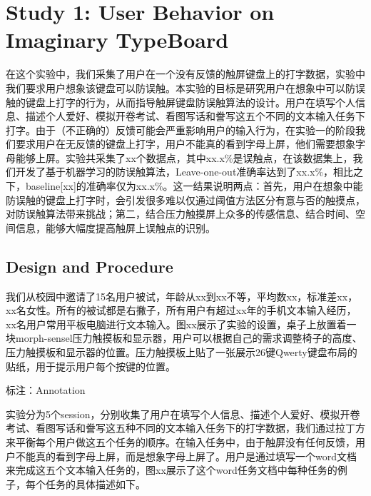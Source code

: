 \section{Study 1: User Behavior on Imaginary TypeBoard}

在这个实验中，我们采集了用户在一个没有反馈的触屏键盘上的打字数据，实验中我们要求用户想象该键盘可以防误触。本实验的目标是研究用户在想象中可以防误触的键盘上打字的行为，从而指导触屏键盘防误触算法的设计。用户在填写个人信息、描述个人爱好、模拟开卷考试、看图写话和誊写这五个不同的文本输入任务下打字。由于（不正确的）反馈可能会严重影响用户的输入行为，在实验一的阶段我们要求用户在无反馈的键盘上打字，用户不能真的看到字母上屏，他们需要想象字母能够上屏。实验共采集了xx个数据点，其中xx.x\%是误触点，在该数据集上，我们开发了基于机器学习的防误触算法，Leave-one-out准确率达到了xx.x\%，相比之下，baseline[xx]的准确率仅为xx.x\%。这一结果说明两点：首先，用户在想象中能防误触的键盘上打字时，会引发很多难以仅通过阈值方法区分有意与否的触摸点，对防误触算法带来挑战；第二，结合压力触摸屏上众多的传感信息、结合时间、空间信息，能够大幅度提高触屏上误触点的识别。

\subsection{Design and Procedure}

我们从校园中邀请了15名用户被试，年龄从xx到xx不等，平均数xx，标准差xx，xx名女性。所有的被试都是右撇子，所有用户有超过xx年的手机文本输入经历，xx名用户常用平板电脑进行文本输入。图xx展示了实验的设置，桌子上放置着一块morph-sensel压力触摸板和显示器，用户可以根据自己的需求调整椅子的高度、压力触摸板和显示器的位置。压力触摸板上贴了一张展示26键Qwerty键盘布局的贴纸，用于提示用户每个按键的位置。

标注：Annotation

实验分为5个session，分别收集了用户在填写个人信息、描述个人爱好、模拟开卷考试、看图写话和誊写这五种不同的文本输入任务下的打字数据，我们通过拉丁方来平衡每个用户做这五个任务的顺序。在输入任务中，由于触屏没有任何反馈，用户不能真的看到字母上屏，而是想象字母上屏了。用户是通过填写一个word文档来完成这五个文本输入任务的，图xx展示了这个word任务文档中每种任务的例子，每个任务的具体描述如下。

